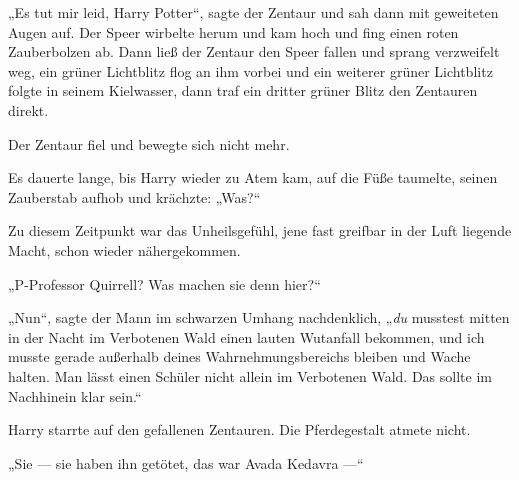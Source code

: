 „Es tut mir leid, Harry Potter“, sagte der Zentaur und sah dann mit geweiteten Augen auf. Der Speer wirbelte herum und kam hoch und fing einen roten Zauberbolzen ab. Dann ließ der Zentaur den Speer fallen und sprang verzweifelt weg, ein grüner Lichtblitz flog an ihm vorbei und ein weiterer grüner Lichtblitz folgte in seinem Kielwasser, dann traf ein dritter grüner Blitz den Zentauren direkt.

Der Zentaur fiel und bewegte sich nicht mehr.

Es dauerte lange, bis Harry wieder zu Atem kam, auf die Füße taumelte, seinen Zauberstab aufhob und krächzte:
„Was?“

Zu diesem Zeitpunkt war das Unheilsgefühl, jene fast greifbar in der Luft liegende Macht, schon wieder nähergekommen.

„P-Professor Quirrell? Was machen sie denn hier?“

„Nun“, sagte der Mann im schwarzen Umhang nachdenklich,
„\emph{du} musstest mitten in der Nacht im Verbotenen Wald einen lauten Wutanfall bekommen, und ich musste gerade außerhalb deines Wahrnehmungsbereichs bleiben und Wache halten. Man lässt einen Schüler nicht allein im Verbotenen Wald. Das sollte im Nachhinein klar sein.“

Harry starrte auf den gefallenen Zentauren. Die Pferdegestalt atmete nicht.

„Sie — sie haben ihn getötet, das war Avada Kedavra —“


